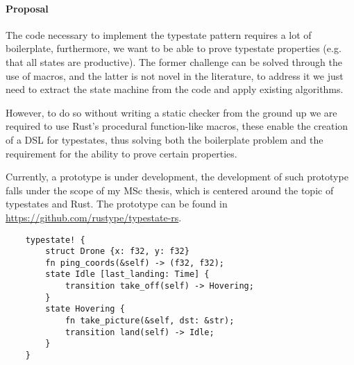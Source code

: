 \documentclass{article}
\begin{document}

\paragraph{Proposal}

The code necessary to implement the typestate pattern requires a lot of boilerplate,
furthermore, we want to be able to prove typestate properties (e.g. that all states are productive).
The former challenge can be solved through the use of macros,
and the latter is not novel in the literature,
to address it we just need to extract the state machine from the code and apply existing algorithms.

However, to do so without writing a static checker from the ground up we are required to use Rust's procedural function-like macros, these enable the creation of a DSL for typestates, thus solving both the boilerplate problem and the requirement for the ability to prove certain properties.

Currently, a prototype is under development, the development of such prototype falls under the scope of my MSc thesis, which is centered around the topic of typestates and Rust.
The prototype can be found in \url{https://github.com/rustype/typestate-rs}.

\begin{verbatim}
    typestate! {
        struct Drone {x: f32, y: f32}
        fn ping_coords(&self) -> (f32, f32);
        state Idle [last_landing: Time] {
            transition take_off(self) -> Hovering;
        }
        state Hovering {
            fn take_picture(&self, dst: &str);
            transition land(self) -> Idle;
        }
    }
\end{verbatim}
\end{document}
